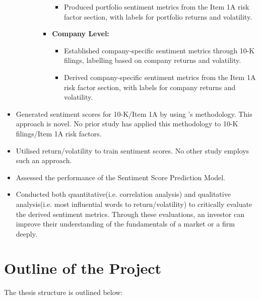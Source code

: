 \documentclass[logo,bsc,singlespacing,parskip]{infthesis}
\begin{document}
\begin{itemize}
\begin{itemize}
\begin{itemize}
\begin{itemize}
\begin{itemize}
                  \item Produced portfolio sentiment metrics from the Item 1A risk factor section, with labels for portfolio returns and volatility.
                \end{itemize}
              \item \textbf{Company Level:}
                \begin{itemize}
                  \item Established company-specific sentiment metrics through 10-K filings, labelling based on company returns and volatility.
                  \item Derived company-specific sentiment metrics from the Item 1A risk factor section, with labels for company returns and volatility.
                \end{itemize}
            \end{itemize}
        \end{itemize}
    \end{itemize}
    \item Generated sentiment scores for 10-K/Item 1A by using \cite{ke2020predicting}'s methodology. This approach is novel. No prior study has applied this methodology to 10-K filings/Item 1A risk factors. 
    \item Utilised return/volatility to train sentiment scores. No other study employs such an approach.  
    \item Assessed the performance of the Sentiment Score Prediction Model.
    \item Conducted both quantitative(i.e. correlation analysis) and qualitative analysis(i.e. most influential words to return/volatility) to critically evaluate the derived sentiment metrics. Through these evaluations, an investor can improve their understanding of the fundamentals of a market or a firm deeply.
\end{itemize}


\section{Outline of the Project}
The thesis structure is outlined below:
\end{document}
